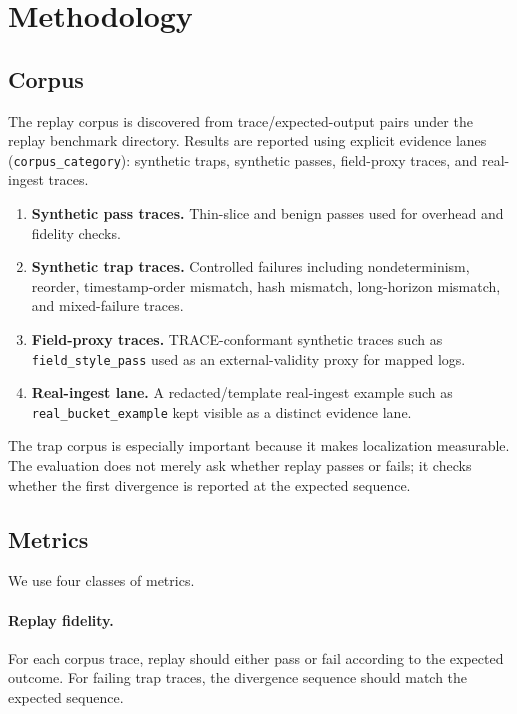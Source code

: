 \documentclass[11pt]{article}
\newcommand{\field}[1]{\texttt{#1}}
\newcommand{\code}[1]{\texttt{#1}}
\begin{document}
\section{Methodology}

\subsection{Corpus}

The replay corpus is discovered from trace/expected-output pairs under the replay benchmark directory. Results are reported using explicit evidence lanes (\field{corpus\_category}): synthetic traps, synthetic passes, field-proxy traces, and real-ingest traces.

\begin{enumerate}[leftmargin=1.5em]
    \item \textbf{Synthetic pass traces.} Thin-slice and benign passes used for overhead and fidelity checks.
    \item \textbf{Synthetic trap traces.} Controlled failures including nondeterminism, reorder, timestamp-order mismatch, hash mismatch, long-horizon mismatch, and mixed-failure traces.
    \item \textbf{Field-proxy traces.} TRACE-conformant synthetic traces such as \code{field\_style\_pass} used as an external-validity proxy for mapped logs.
    \item \textbf{Real-ingest lane.} A redacted/template real-ingest example such as \code{real\_bucket\_example} kept visible as a distinct evidence lane.
\end{enumerate}

The trap corpus is especially important because it makes localization measurable. The evaluation does not merely ask whether replay passes or fails; it checks whether the first divergence is reported at the expected sequence.

\subsection{Metrics}

We use four classes of metrics.

\paragraph{Replay fidelity.}
For each corpus trace, replay should either pass or fail according to the expected outcome. For failing trap traces, the divergence sequence should match the expected sequence.
\end{document}
